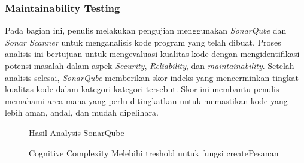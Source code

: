 \subsubsection{Maintainability Testing}
Pada bagian ini, penulis melakukan pengujian menggunakan \textit{SonarQube} dan \textit{Sonar Scanner} untuk menganalisis kode program yang telah dibuat. Proses analisis ini bertujuan untuk mengevaluasi kualitas kode dengan mengidentifikasi potensi masalah dalam aspek \textit{Security}, \textit{Reliability}, dan \textit{maintainability}. Setelah analisis selesai, \textit{SonarQube} memberikan skor indeks yang mencerminkan tingkat kualitas kode dalam kategori-kategori tersebut. Skor ini membantu penulis memahami area mana yang perlu ditingkatkan untuk memastikan kode yang lebih aman, andal, dan mudah dipelihara.
\begin{figure}[H]
	{\par}
	\caption{Hasil Analysis SonarQube}
	\label{maintainability-testing-1}
\end{figure}
\begin{figure}[H]
	{\par}
	\caption{Cognitive Complexity Melebihi treshold untuk fungsi createPesanan}
	\label{maintainability-testing-2}
\end{figure}

